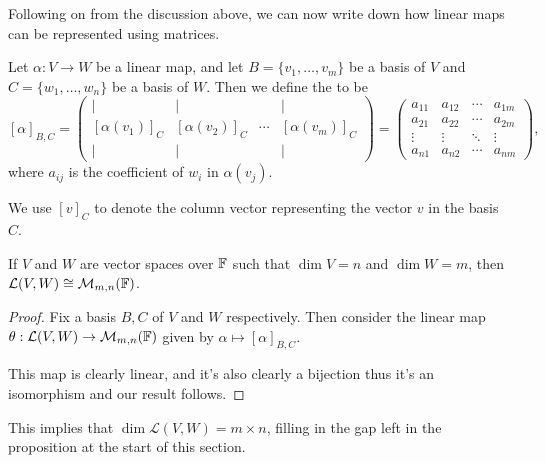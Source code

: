 \documentclass[a4paper]{scrartcl}
\begin{document}
Following on from the discussion above, we can now write down how linear maps can be represented using matrices.

\begin{definition}
    Let $\alpha: V \rightarrow W$ be a linear map, and let $B = \{v_1, \dots, v_m\}$ be a basis of $V$ and $C = \{w_1, \dots, w_n\}$ be a basis of $W$. Then we define the  to be
    $$
    [\alpha]_{B, C} = \begin{pmatrix}
        | & | & & | \\
        [\alpha(v_1)]_C & [\alpha(v_2)]_C & \cdots & [\alpha(v_m)]_C \\
        | & | & & |
    \end{pmatrix} = \begin{pmatrix}
        a_{11} & a_{12} & \cdots & a_{1m} \\
        a_{21} & a_{22} & \cdots & a_{2m} \\
        \vdots&\vdots&\ddots &\vdots\\
        a_{n1} & a_{n2} & \cdots & a_{nm}
    \end{pmatrix},
    $$
    where $a_{ij}$ is the coefficient of $w_i$ in $\alpha(v_j)$.
\end{definition}
\begin{remark}[Notation]
    We use $[v]_C$ to denote the column vector representing the vector $v$ in the basis $C$.
\end{remark}


\begin{proposition}
    If $V$ and $W$ are vector spaces over $\mathbb{F}$ such that $\dim V = n$ and $\dim W = m$, then $\mathcal{L}(V, W) \cong \mathcal{M}_{m, n}(\mathbb{F})$.
\end{proposition}
\begin{proof}
    Fix a basis $B, C$ of $V$ and $W$ respectively.
    Then consider the linear map
    $
    \theta: \mathcal{L}(V, W) \rightarrow \mathcal{M}_{m, n}(\mathbb{F})
    $ given by $\alpha \mapsto [\alpha]_{B, C}$.

    This map is clearly linear, and it's also clearly a bijection thus it's an isomorphism and our result follows.
\end{proof}

\begin{remark}
    This implies that $\dim \mathcal{L}(V, W) = m \times n$, filling in the gap left in the proposition at the start of this section.
\end{remark}
\end{document}
